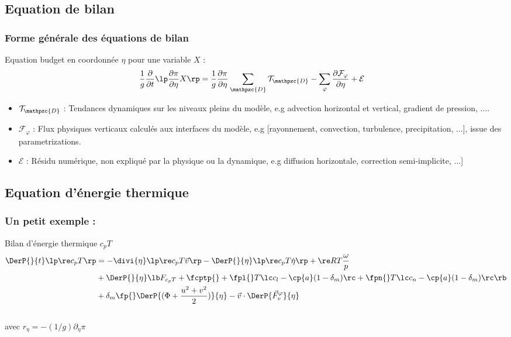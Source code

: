 \documentclass[aspectratio=169]{beamer}
\newcommand{\dr}{\partial}
\begin{document}
\subsection{Equation de bilan}
\begin{frame}
\frametitle{\normalsize Forme générale des équations de bilan}
\vspace{-0.25cm}
\begin{block}{\small Equation budget en coordonnée $\eta$ pour une variable $X$ :}
%  
\small
\begin{align*}
\frac{1}{g}\frac{\dr}{\dr t}\lp \frac{\dr \pi}{\dr\eta}X \rp & = 
\frac{1}{g}\frac{\dr \pi}{\dr\eta}\sum_{\mathpzc{D}} \mathcal{T}_{\mathpzc{D}} 
- \sum_{\varphi} \frac{\dr \mathcal{F}_{\varphi}}{\dr\eta}
+ \mathcal{E}
\end{align*}
%
\begin{itemize}
\item $\mathcal{T}_{\mathpzc{D}}$ : Tendances dynamiques sur les niveaux pleins du modèle, 
e.g advection horizontal et vertical, gradient de pression,  $\ldots$.
%
\item $\mathcal{F}_{\varphi}$ : Flux physiques verticaux calculés aux interfaces du modèle, 
e.g [rayonnement, convection, turbulence, precipitation, $\ldots$], issue des parametrizations.
%
\item $\mathcal{E}$ : Résidu numérique, non expliqué par la physique ou la dynamique, e.g diffusion horizontale, correction semi-implicite, ...]  
\end{itemize}
%
\end{block}
\end{frame}

\subsection{Equation d'énergie thermique}
\begin{frame}
\frametitle{{\normalsize Un petit exemple :} }

\begin{block}{Bilan d'énergie thermique $c_p T$}
\footnotesize
\begin{align}
  \DerP{}{t}\lp\re c_p T\rp &=
  - \divi{\eta}\lp\re c_p T \vec{v}\rp
  - \DerP{}{\eta}\lp\re c_p T \dot{\eta}\rp
  + \re R T \frac{\omega}{p}\nonumber \\
  &  +\DerP{}{\eta}\lb F_{c_p T} + \fcptp{}
  + \fpl{} T \lc c_l - \cp{a} (1-\delta_m)\rc 
  + \fpn{} T \lc c_n - \cp{a} (1-\delta_m)\rc\rb\nonumber\\
  & 
  +\delta_m\fp{}\DerP{(\Phi+\frac{u^2+v^2}{2})}{\eta}
  -\vec v\cdot\DerP{\vec F_v^{\varphi}}{\eta}\label{Bilh}
\end{align}
\vspace*{0.5cm}\\
avec $r_{\eta}=-(1/g)\dr_{\eta}\pi$
\end{block}


\logos

\end{frame}
\end{document}
